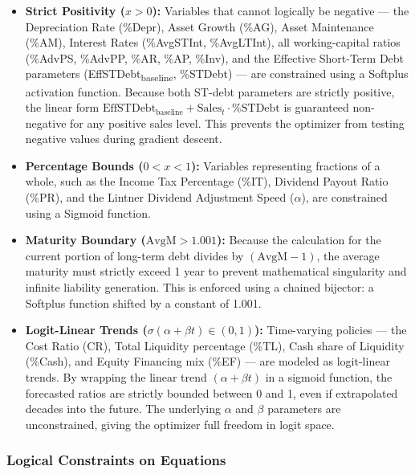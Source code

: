 \documentclass[12pt,a4paper]{article}
\begin{document}
\begin{itemize}
\item
  \textbf{Strict Positivity ($x > 0$):} Variables that
  cannot logically be negative --- the Depreciation Rate (\%Depr),
  Asset Growth (\%AG), Asset Maintenance (\%AM), Interest Rates
  (\%AvgSTInt, \%AvgLTInt), all working-capital ratios (\%AdvPS,
  \%AdvPP, \%AR, \%AP, \%Inv), and the Effective Short-Term Debt
  parameters (EffSTDebt\textsubscript{baseline}, \%STDebt) --- are
  constrained using a Softplus activation function. Because both
  ST-debt parameters are strictly positive, the linear form
  $\text{EffSTDebt}_{\text{baseline}} + \text{Sales}_t \cdot
  \text{\%STDebt}$ is guaranteed non-negative for any positive sales
  level. This prevents the optimizer from testing negative values
  during gradient descent.
\item
  \textbf{Percentage Bounds ($0 < x < 1$):}
  Variables representing fractions of a whole, such as the Income Tax
  Percentage (\%IT), Dividend Payout Ratio (\%PR), and the Lintner
  Dividend Adjustment Speed ($\alpha$), are constrained
  using a Sigmoid function.
\item
  \textbf{Maturity Boundary ($\text{AvgM} > 1.001$):} Because
  the calculation for the current portion of long-term debt divides by
  $(\text{AvgM} - 1)$, the average maturity must strictly exceed 1 year to
  prevent mathematical singularity and infinite liability generation.
  This is enforced using a chained bijector: a Softplus function shifted
  by a constant of 1.001.
\item
  \textbf{Logit-Linear Trends ($\sigma(\alpha + \beta t) \in (0,1)$):}
  Time-varying policies --- the Cost Ratio (CR), Total Liquidity
  percentage (\%TL), Cash share of Liquidity (\%Cash), and Equity
  Financing mix (\%EF) --- are modeled as logit-linear trends.
  By wrapping the linear trend $(\alpha + \beta t)$ in a sigmoid
  function, the forecasted ratios are strictly bounded between 0 and 1,
  even if extrapolated decades into the future. The underlying
  $\alpha$ and $\beta$ parameters are unconstrained, giving the
  optimizer full freedom in logit space.
\end{itemize}

\subsubsection{Logical Constraints on Equations}
\end{document}
